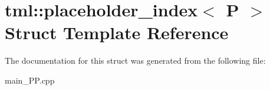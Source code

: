 \hypertarget{structtml_1_1placeholder__index}{\section{tml\+:\+:placeholder\+\_\+index$<$ P $>$ Struct Template Reference}
\label{structtml_1_1placeholder__index}
}


The documentation for this struct was generated from the following file\+:\begin{DoxyCompactItemize}
\item 
main\+\_\+\+P\+P.\+cpp\end{DoxyCompactItemize}
